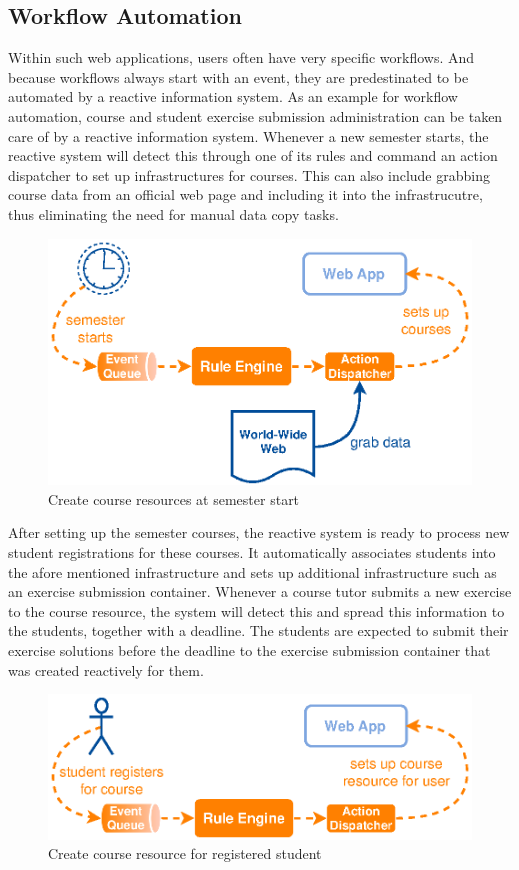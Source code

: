 \subsection{Workflow Automation}
Within such web applications, users often have very specific workflows.
And because workflows always start with an event, they are predestinated to be automated by a reactive information system.
As an example for workflow automation, course and student exercise submission administration can be taken care of by a reactive information system.
Whenever a new semester starts, the reactive system will detect this through one of its rules and command an action dispatcher to set up infrastructures for courses.
This can also include grabbing course data from an official web page and including it into the infrastrucutre, thus eliminating the need for manual data copy tasks.
\begin{figure}[!ht]
  \centering
  \includegraphics{figures/ProBinderCourseSetup}
  \caption{Create course resources at semester start}
  \label{fig:ProBinderCourseSetup}
\end{figure}

After setting up the semester courses, the reactive system is ready to process new student registrations for these courses.
It automatically associates students into the afore mentioned infrastructure and sets up additional infrastructure such as an exercise submission container.
Whenever a course tutor submits a new exercise to the course resource, the system will detect this and spread this information to the students, together with a deadline.
The students are expected to submit their exercise solutions before the deadline to the exercise submission container that was created reactively for them.
\begin{figure}[!ht]
  \centering
  \includegraphics{figures/ProBinderStudentRegisters}
  \caption{Create course resource for registered student}
  \label{fig:ProBinderStudentRegisters}
\end{figure}

